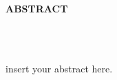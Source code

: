 
\begin{center}

\end{center}

\begin{center}
	{{\bf\fontsize{14pt}{14.5pt}\selectfont \uppercase{ABSTRACT}}}
\end{center}

\doublespacing
{}



\begin{center}
	\begin{doublespace}
		{\fontsize{14pt}{14.5pt}\selectfont {Title of Dissertation/Thesis}}\\
		{\fontsize{14pt}{14.5pt}\selectfont {Student Full Name}}\\
	\end{doublespace}
\end{center}

insert your abstract here.